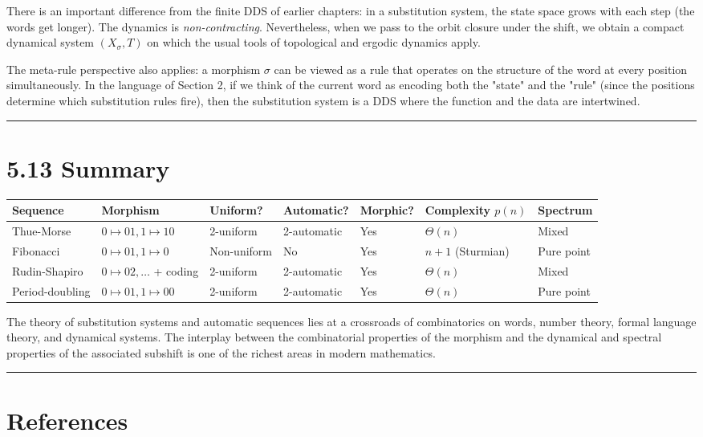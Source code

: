 There is an important difference from the finite DDS of earlier chapters: in a substitution system, the state space grows with each step (the words get longer). The dynamics is \textit{non-contracting}. Nevertheless, when we pass to the orbit closure under the shift, we obtain a compact dynamical system $(X_\sigma, T)$ on which the usual tools of topological and ergodic dynamics apply.

The meta-rule perspective also applies: a morphism $\sigma$ can be viewed as a rule that operates on the structure of the word at every position simultaneously. In the language of Section 2, if we think of the current word as encoding both the "state" and the "rule" (since the positions determine which substitution rules fire), then the substitution system is a DDS where the function and the data are intertwined.

\bigskip\hrule\bigskip

\section{5.13 Summary}

\begin{tabular}{|l|l|l|l|l|l|l|}
\hline
Sequence & Morphism & Uniform? & Automatic? & Morphic? & Complexity $p(n)$ & Spectrum \\
\hline
Thue-Morse & $0 \mapsto 01, 1 \mapsto 10$ & 2-uniform & 2-automatic & Yes & $\Theta(n)$ & Mixed \\
Fibonacci & $0 \mapsto 01, 1 \mapsto 0$ & Non-uniform & No & Yes & $n+1$ (Sturmian) & Pure point \\
Rudin-Shapiro & $0 \mapsto 02, \ldots$ + coding & 2-uniform & 2-automatic & Yes & $\Theta(n)$ & Mixed \\
Period-doubling & $0 \mapsto 01, 1 \mapsto 00$ & 2-uniform & 2-automatic & Yes & $\Theta(n)$ & Pure point \\
\hline
\end{tabular}


The theory of substitution systems and automatic sequences lies at a crossroads of combinatorics on words, number theory, formal language theory, and dynamical systems. The interplay between the combinatorial properties of the morphism and the dynamical and spectral properties of the associated subshift is one of the richest areas in modern mathematics.

\bigskip\hrule\bigskip

\section{References}

